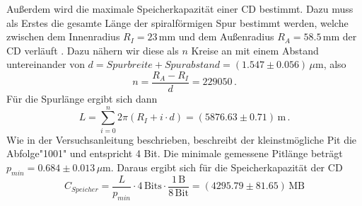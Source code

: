         Außerdem wird die maximale Speicherkapazität einer CD bestimmt. Dazu muss als Erstes die gesamte Länge der spiralförmigen Spur bestimmt werden, welche zwischen dem Innenradius $R_I=23\,\text{mm}$ und dem Außenradius $R_A=58.5\,\text{mm}$ der CD verläuft \cite{RadiusCD}. Dazu nähern wir diese als $n$ Kreise an mit einem Abstand untereinander von $d=Spurbreite+Spurabstand=(1.547\pm 0.056)\,\mu\text{m}$, also
        \begin{equation}
            n=\frac{R_A-R_I}{d}=229050 \, .
        \end{equation}
        Für die Spurlänge ergibt sich dann
        \begin{equation}
            L = \sum_{i=0}^{n} 2\pi\left(R_I+i\cdot d\right) = (5876.63 \pm 0.71) \, \text{m} \, .
        \end{equation}
        Wie in der Versuchsanleitung beschrieben, beschreibt der kleinstmögliche Pit die Abfolge"1001" und entspricht 4 Bit. Die minimale gemessene Pitlänge beträgt $p_{min}=0.684\pm 0.013\,\mu\text{m}$. Daraus ergibt sich für die Speicherkapazität der CD
        \begin{equation}
            C_{Speicher} = \frac{L}{p_{min}}\cdot 4\,\text{Bits} \cdot \frac{1\,\text{B}}{8\,\text{Bit}} = (4295.79\pm 81.65)\,\text{MB}
        \end{equation}
        \FloatBarrier

